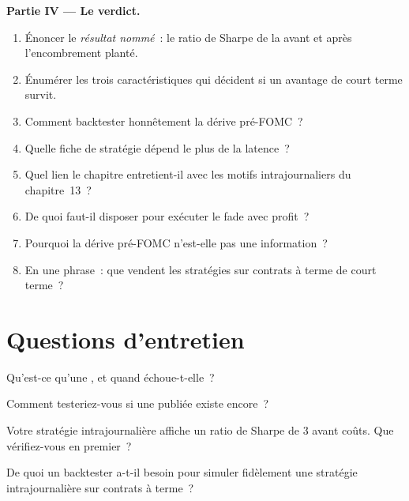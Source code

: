 \begin{problem}
\medskip\noindent\textbf{Partie IV --- Le verdict.}
\begin{enumerate}[resume]
\item Énoncer le \emph{résultat nommé}~: le ratio de Sharpe de la  avant et après l'encombrement planté.
\item Énumérer les trois caractéristiques qui décident si un avantage de court terme survit.
\item Comment backtester honnêtement la dérive pré-FOMC~?
\item Quelle fiche de stratégie dépend le plus de la latence~?
\item Quel lien le chapitre entretient-il avec les motifs intrajournaliers du chapitre~13~?
\item De quoi faut-il disposer pour exécuter le fade avec profit~?
\item Pourquoi la dérive pré-FOMC n'est-elle pas une information~?
\item En une phrase~: que vendent les stratégies sur contrats à terme de court terme~?
\end{enumerate}
\end{problem}

\section{Questions d'entretien}

\begin{interviewq}\label{iq:s1:short-term-futures-strategies:1}
Qu'est-ce qu'une , et quand échoue-t-elle~?
\end{interviewq}

\begin{interviewq}\label{iq:s1:short-term-futures-strategies:2}
Comment testeriez-vous si une  publiée existe encore~?
\end{interviewq}

\begin{interviewq}\label{iq:s1:short-term-futures-strategies:3}
Votre stratégie intrajournalière affiche un ratio de Sharpe de 3 avant coûts. Que vérifiez-vous en premier~?
\end{interviewq}

\begin{interviewq}\label{iq:s1:short-term-futures-strategies:4}
De quoi un backtester a-t-il besoin pour simuler fidèlement une stratégie intrajournalière sur contrats à terme~?
\end{interviewq}

